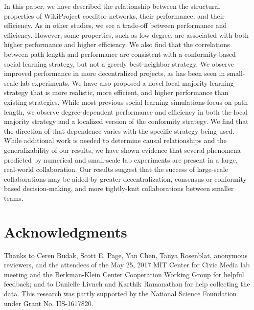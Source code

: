 \documentclass[letterpaper,twocolumn,10pt]{article}
\newcommand{\+}{\phantom{-}}
\begin{document}
In this paper, we have described the relationship between the structural properties of WikiProject
coeditor networks, their performance, and their efficiency.
As in other studies, we see a trade-off between performance and efficiency.
However, 
some properties, such as low degree, are associated with
both higher performance and higher efficiency.
We also find that the correlations between path length and performance are consistent with a conformity-based
social learning strategy, but not a greedy best-neighbor strategy.
We observe improved performance in more decentralized projects,
as has been seen in small-scale lab experiments.
We have also proposed a novel local majority learning strategy that is more realistic,
more efficient, and higher performance than existing strategies.
While most previous social learning simulations focus on path length,
we observe degree-dependent performance and efficiency
in both the local majority strategy
and a localized version of the conformity strategy.
We find that the direction of that dependence varies with the
specific strategy being used.
While additional work is needed to determine causal relationships
and the generalizability of our results,
we have shown evidence that several phenomena predicted by numerical
and small-scale lab experiments are present in a large,
real-world collaboration.
Our results suggest that the success of large-scale collaborations may be aided
by greater decentralization,
consensus or conformity-based decision-making,
and more tightly-knit collaborations between smaller teams.

\section{Acknowledgments}
Thanks to
Ceren Budak, Scott E. Page, Yan Chen, Tanya Rosenblat,
anonymous reviewers,
and the attendees of the May 25, 2017 MIT Center for Civic Media lab meeting
and the Berkman-Klein Center Cooperation Working Group for helpful feedback;
and to Danielle Livneh and Karthik Ramanathan for help collecting the data.
This research was partly supported by the National Science Foundation under Grant No. IIS-1617820.



\end{document}
